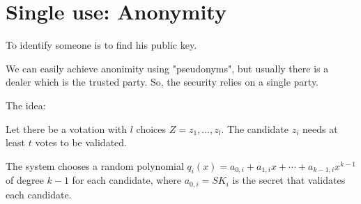 \chapter{Single use: Anonymity}

To identify someone is to find his public key.

We can easily achieve anonimity using "pseudonyms", but usually there is a dealer which is the trusted party. So, the security relies on a single party.

The idea:

Let there be a votation with $l$ choices $Z ={z_1, \dots, z_l}$. The candidate $z_i$ needs at least $t$ votes to be validated.

The system chooses a random polynomial $q_i(x) = a_{0,i} + a_{1,i} x + \cdots + a_{k-1 , i}  x ^{k-1}$ of degree $k-1$ for each candidate, where $a_{0,i} = SK_i$ is the secret that validates each candidate.


